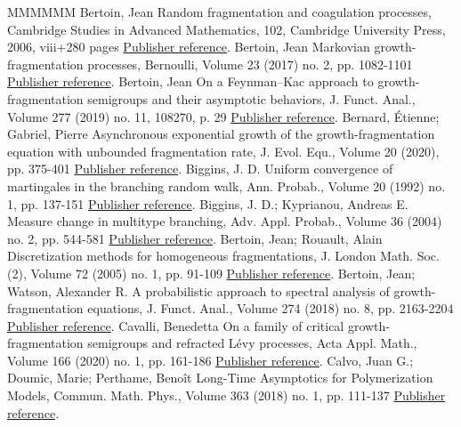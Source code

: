 \documentclass[11pt]{article}
\theoremstyle{definition}
\numberwithin{equation}{section}
\numberwithin{figure}{section}
\numberwithin{table}{section}
\begin{document}
\begin{thebibliography}{MMMMMM}
 Bertoin, Jean Random fragmentation and coagulation processes, Cambridge Studies in Advanced Mathematics, 102, Cambridge University Press, 2006, viii+280 pages \href{https://ahl.centre-mersenne.org/item/AHL_2020__3__795_0/#Ber-frag}{Publisher reference}.
 Bertoin, Jean Markovian growth-fragmentation processes, Bernoulli, Volume 23 (2017) no. 2, pp. 1082-1101 \href{https://ahl.centre-mersenne.org/item/AHL_2020__3__795_0/#BeGF}{Publisher reference}.
 Bertoin, Jean On a Feynman–Kac approach to growth-fragmentation semigroups and their asymptotic behaviors, J. Funct. Anal., Volume 277 (2019) no. 11, 108270, p. 29 \href{https://ahl.centre-mersenne.org/item/AHL_2020__3__795_0/#BeFK}{Publisher reference}.
 Bernard, Étienne; Gabriel, Pierre Asynchronous exponential growth of the growth-fragmentation equation with unbounded fragmentation rate, J. Evol. Equ., Volume 20 (2020), pp. 375-401 \href{https://ahl.centre-mersenne.org/item/AHL_2020__3__795_0/#BerGab2}{Publisher reference}.
 Biggins, J. D. Uniform convergence of martingales in the branching random walk, Ann. Probab., Volume 20 (1992) no. 1, pp. 137-151 \href{https://ahl.centre-mersenne.org/item/AHL_2020__3__795_0/#Biggins92}{Publisher reference}.
 Biggins, J. D.; Kyprianou, Andreas E. Measure change in multitype branching, Adv. Appl. Probab., Volume 36 (2004) no. 2, pp. 544-581 \href{https://ahl.centre-mersenne.org/item/AHL_2020__3__795_0/#BigKyp}{Publisher reference}.
 Bertoin, Jean; Rouault, Alain Discretization methods for homogeneous fragmentations, J. London Math. Soc. (2), Volume 72 (2005) no. 1, pp. 91-109 \href{https://ahl.centre-mersenne.org/item/AHL_2020__3__795_0/#BeRou}{Publisher reference}.
 Bertoin, Jean; Watson, Alexander R. A probabilistic approach to spectral analysis of growth-fragmentation equations, J. Funct. Anal., Volume 274 (2018) no. 8, pp. 2163-2204 \href{https://ahl.centre-mersenne.org/item/AHL_2020__3__795_0/#BW}{Publisher reference}.
 Cavalli, Benedetta On a family of critical growth-fragmentation semigroups and refracted Lévy processes, Acta Appl. Math., Volume 166 (2020) no. 1, pp. 161-186 \href{https://ahl.centre-mersenne.org/item/AHL_2020__3__795_0/#Cavalli}{Publisher reference}.
 Calvo, Juan G.; Doumic, Marie; Perthame, Benoît Long-Time Asymptotics for Polymerization Models, Commun. Math. Phys., Volume 363 (2018) no. 1, pp. 111-137 \href{https://ahl.centre-mersenne.org/item/AHL_2020__3__795_0/#CalvoDoumicPerthame}{Publisher reference}.

\end{thebibliography}
\end{document}
